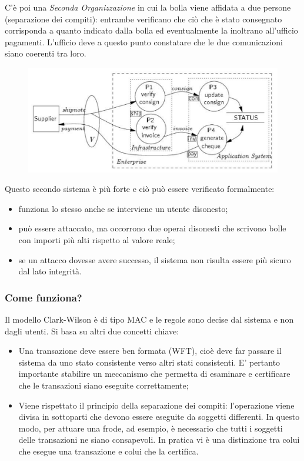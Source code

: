 C'è poi una \textit{Seconda Organizzazione} in cui la bolla viene affidata a due
persone (separazione dei compiti): entrambe verificano che ciò che è stato
consegnato corrisponda a quanto indicato dalla bolla ed eventualmente la
inoltrano all'ufficio pagamenti. L'ufficio deve a questo punto constatare che le
due comunicazioni siano coerenti tra loro.

\begin{figure}[H]
      \centering
      \includegraphics[width=\textwidth, keepaspectratio]{capitoli/policy/imgs/clark_wilson2.png}
\end{figure}

Questo secondo sistema è più forte e ciò può essere verificato formalmente:
\begin{itemize}
      \item funziona lo stesso anche se interviene un utente disonesto;
      \item può essere attaccato, ma occorrono due operai disonesti che scrivono
            bolle con importi più alti rispetto al valore reale;
      \item se un attacco dovesse avere successo, il sistema non risulta essere
            più sicuro dal lato integrità.
\end{itemize}

\subsubsection{Come funziona?}

Il modello Clark-Wilson è di tipo MAC e le regole sono decise dal sistema e non
dagli utenti.
Si basa su altri due concetti chiave:

\begin{itemize}
      \item Una transazione deve essere ben formata (WFT), cioè deve far passare
            il sistema da uno
            stato consistente verso altri stati consistenti. E' pertanto
            importante stabilire un
            meccanismo che permetta di esaminare e certificare che le transazioni
            siano eseguite
            correttamente;
      \item Viene rispettato il principio della separazione dei compiti:
            l'operazione viene divisa in
            sottoparti che devono essere eseguite da soggetti differenti.
            In questo modo, per attuare
            una frode, ad esempio, è necessario che tutti i soggetti delle
            transazioni ne siano
            consapevoli. In pratica vi è una distinzione tra colui che esegue
            una transazione e colui che
            la certifica.
\end{itemize}

